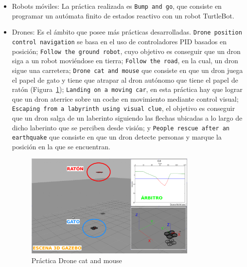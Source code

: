 \begin{itemize}
	\item Robots móviles: La práctica realizada es  \texttt{Bump and go}, que consiste en programar un autómata finito de estados reactivo con un robot TurtleBot.

	\item Drones: Es el ámbito que posee más prácticas desarrolladas. \texttt{Drone position control navigation} se basa en el uso de controladores PID basados en posición; \texttt{Follow the ground robot}, cuyo objetivo es conseguir que un dron siga a un robot moviéndose en tierra; \texttt{Follow the road}, en la cual, un dron sigue una carretera; \texttt{Drone cat and mouse} que consiste en que un dron juega el papel de gato y tiene que atrapar al dron autónomo que tiene el papel de ratón (Figura~\ref{fig.dron}); \texttt{Landing on a moving car}, en esta práctica hay que lograr que un dron aterrice sobre un coche en movimiento mediante control visual; \texttt{Escaping from a labyrinth using visual clue}, el objetivo es conseguir que un dron salga de un laberinto siguiendo las flechas ubicadas a lo largo de dicho laberinto que se perciben desde visión; y \texttt{People rescue after an earthquake} que consiste en que un dron detecte personas y marque la posición en la que se encuentran.
	
\begin{figure}[H]
  	\begin{center}
    	\includegraphics[width=0.8\textwidth]{figures/Introduccion/gatoraton.png}
			\caption{Práctica Drone cat and mouse}
			\label{fig.dron}
			\end{center}
	\end{figure}
\end{itemize}

